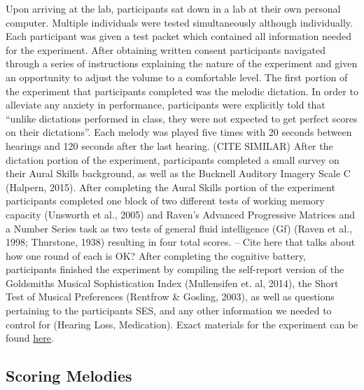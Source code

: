 \documentclass[]{book}
\begin{document}
Upon arriving at the lab, participants sat down in a lab at their own personal computer.
Multiple individuals were tested simultaneously although individually.
Each participant was given a test packet which contained all information needed for the experiment.
After obtaining written consent participants navigated through a series of instructions explaining the nature of the experiment and given an opportunity to adjust the volume to a comfortable level.
The first portion of the experiment that participants completed was the melodic dictation.
In order to alleviate any anxiety in performance, participants were explicitly told that ``unlike dictations performed in class, they were not expected to get perfect scores on their dictations''.
Each melody was played five times with 20 seconds between hearings and 120 seconds after the last hearing. (CITE SIMILAR)
After the dictation portion of the experiment, participants completed a small survey on their Aural Skills background, as well as the Bucknell Auditory Imagery Scale C (Halpern, 2015).
After completing the Aural Skills portion of the experiment participants completed one block of two different tests of working memory capacity (Unsworth et al., 2005) and Raven's Advanced Progressive Matrices and a Number Series task as two tests of general
fluid intelligence (Gf) (Raven et al., 1998; Thurstone, 1938) resulting in four total scores.
-- Cite here that talks about how one round of each is OK?
After completing the cognitive battery, participants finished the experiment by compiling the self-report version of the Goldsmiths Musical Sophistication Index (Mullensifen et. al, 2014), the Short Test of Musical Preferences (Rentfrow \& Gosling, 2003), as well as questions pertaining to the participants SES, and any other information we needed to control for (Hearing Loss, Medication). Exact materials for the experiment can be found \href{https://github.com/davidjohnbaker1/modelingMelodicDictation}{here}.

\hypertarget{scoring-melodies}{%
\subsection{Scoring Melodies}\label{scoring-melodies}}
\end{document}
